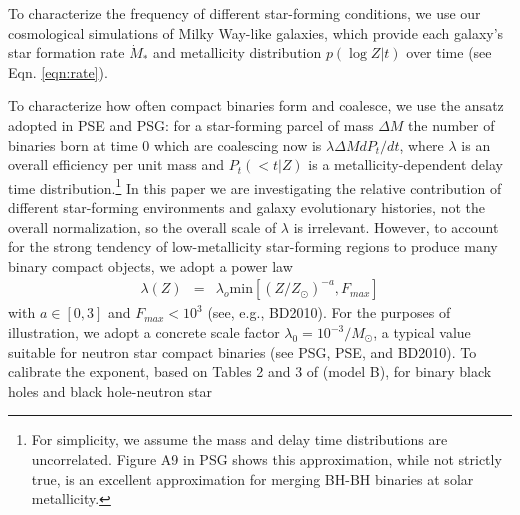 \documentclass[nofootinbib,twocolumn,prd]{emulateapj}
\newcommand\abbrvPSgrb{PSG}
\newcommand\abbrvPSellipticals{PSE}
\newcommand\abbrvKBLowZa{BD2010}
\begin{document}
To characterize the frequency of different star-forming conditions, we use our cosmological simulations of Milky Way-like galaxies, which provide each galaxy's star formation rate
$\dot{M}_*$ and metallicity distribution $p(\log Z|t)$ over time (see Eqn. \ref{eqn:rate}).

To characterize how often compact binaries form and coalesce, we use the ansatz adopted in \abbrvPSellipticals{} and
\abbrvPSgrb{}: for a star-forming parcel of mass $\Delta M$ the number of binaries born at time $0$ which
are coalescing now is $\lambda \Delta M dP_t/dt$, where $\lambda$ is an overall efficiency per unit mass and $P_t(<t|Z)$ is
a metallicity-dependent delay time distribution.\footnote{For simplicity, we assume the mass and delay time
  distributions are uncorrelated.  Figure A9 in \abbrvPSgrb{} shows this approximation, while not strictly true, is an
  excellent approximation for merging BH-BH binaries at solar metallicity.  }
    In this paper we are investigating the relative contribution of
different star-forming environments and galaxy evolutionary histories, not the overall normalization, so the overall scale of $\lambda$ is irrelevant.  
However, to account for the strong tendency of low-metallicity star-forming regions to produce many binary compact
objects, we adopt a power law
\begin{eqnarray}
\label{eq:LambdaVersusZModel}
\lambda(Z) &=& \lambda_o \text{min}[(Z/Z_\odot)^{-a}, F_{max}] 
\end{eqnarray}
with $a\in [0,3]$ and $F_{max}<10^3$
 (see, e.g.\cite{popsyn-LIGO-SFR-2008}, \abbrvKBLowZa).  For the purposes of illustration, we adopt a  concrete scale
factor  $\lambda_0 = 10^{-3}/M_\odot $,  a typical value suitable for neutron star compact binaries (see \abbrvPSgrb{},
\abbrvPSellipticals, and \abbrvKBLowZa).
To calibrate the exponent, based on Tables 2 and 3 of
\cite{popsyn-LowMetallicityImpact2-StarTrackRevised-2012} (model B), for binary black holes and black hole-neutron star
\end{document}
